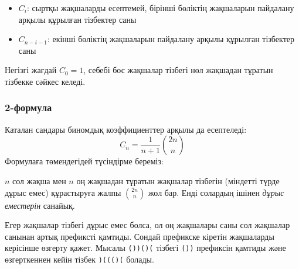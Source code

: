 \begin{itemize}
\item $C_{i}$: сыртқы жақшаларды есептемей, бірінші бөліктің
жақшаларын пайдалану арқылы құрылған тізбектер саны
\item $C_{n-i-1}$: екінші бөліктің
жақшаларын пайдалану арқылы құрылған тізбектер саны
\end{itemize}


Негізгі жағдай $C_0=1$,
себебі бос жақшалар тізбегі нөл жақшадан 
тұратын тізбекке сәйкес келеді.


\subsubsection{2-формула}

Каталан сандары биномдық коэффициенттер
арқылы да есептеледі:
\[ C_n = \frac{1}{n+1} {2n \choose n}\]
Формулаға төмендегідей түсіндірме береміз:


$n$ сол жақша мен  $n$ оң жақшадан тұратын жақшалар 
тізбегін (міндетті түрде дұрыс емес) құрастыруға 
жалпы ${2n \choose n}$ жол бар. Енді солардың
ішінен \emph{дұрыс еместерін} санайық.


Егер жақшалар тізбегі дұрыс емес болса,
ол оң жақшалары саны сол жақшалар санынан артық
префиксті қамтиды. Сондай префикске кіретін
жақшаларды керісінше өзгерту қажет. Мысалы 
\texttt{())()(} тізбегі \texttt{())} префиксін қамтиды
және өзгерткеннен кейін тізбек \texttt{)((()(} болады.

